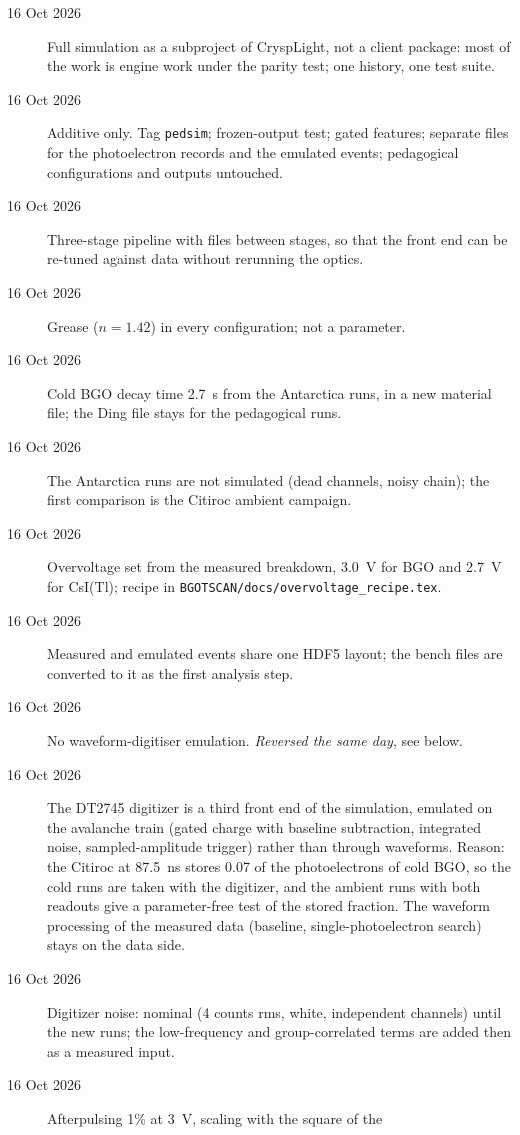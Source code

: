 \documentclass[11pt]{article}
\newcommand{\code}[1]{\texttt{#1}}
\newcommand{\us}{\textmu s\xspace}
\newcommand{\csitl}{CsI(Tl)\xspace}
\begin{document}
\begin{description}
\item[16 Oct 2026] Full simulation as a subproject of CryspLight, not a client
  package: most of the work is engine work under the parity test; one history,
  one test suite.
\item[16 Oct 2026] Additive only. Tag \code{pedsim}; frozen-output test; gated
  features; separate files for the photoelectron records and the emulated
  events; pedagogical configurations and outputs untouched.
\item[16 Oct 2026] Three-stage pipeline with files between stages, so that the
  front end can be re-tuned against data without rerunning the optics.
\item[16 Oct 2026] Grease ($n = 1.42$) in every configuration; not a parameter.
\item[16 Oct 2026] Cold BGO decay time 2.7~\us from the Antarctica runs, in a
  new material file; the Ding file stays for the pedagogical runs.
\item[16 Oct 2026] The Antarctica runs are not simulated (dead channels, noisy
  chain); the first comparison is the Citiroc ambient campaign.
\item[16 Oct 2026] Overvoltage set from the measured breakdown, 3.0~V for BGO
  and 2.7~V for \csitl; recipe in \code{BGOTSCAN/docs/overvoltage\_recipe.tex}.
\item[16 Oct 2026] Measured and emulated events share one HDF5 layout; the
  bench files are converted to it as the first analysis step.
\item[16 Oct 2026] No waveform-digitiser emulation. \emph{Reversed the
  same day}, see below.
\item[16 Oct 2026] The DT2745 digitizer is a third front end of the
  simulation, emulated on the avalanche train (gated charge with baseline
  subtraction, integrated noise, sampled-amplitude trigger) rather than
  through waveforms. Reason: the Citiroc at 87.5~ns stores 0.07 of the
  photoelectrons of cold BGO, so the cold runs are taken with the digitizer,
  and the ambient runs with both readouts give a parameter-free test of the
  stored fraction. The waveform processing of the measured data (baseline,
  single-photoelectron search) stays on the data side.
\item[16 Oct 2026] Digitizer noise: nominal (4 counts rms, white,
  independent channels) until the new runs; the low-frequency and
  group-correlated terms are added then as a measured input.
\item[16 Oct 2026] Afterpulsing 1\% at 3~V, scaling with the square of the

\end{description}
\end{document}
